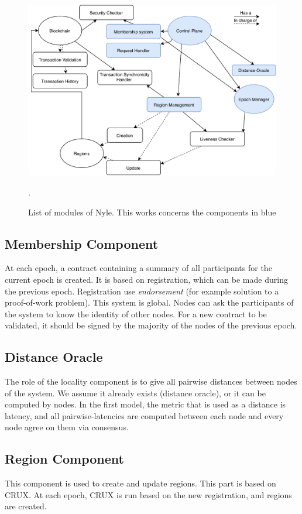 \documentclass[a4paper,11pt,oneside]{report}
\begin{document}
\begin{figure}[!h]
\centering
\includegraphics[width=400pt]{figures/Nyle_components}
\caption{List of modules of Nyle. This works concerns the components in blue}.
\label{fig:modules}
\end{figure}

\subsection{Membership Component}

At each epoch, a contract containing a summary of all participants for the
current epoch is created. It is based on registration, which can be made during
the previous epoch. Registration use \textit{endorsement} (for example solution
to a proof-of-work problem). This system is global. Nodes can ask the
participants of the system to know the identity of other nodes. For a new contract to be validated, it should be signed by the majority of the nodes of the previous
epoch.

\subsection{Distance Oracle}

The role of the locality component is to give all pairwise distances between
nodes of the system. We assume it already exists (distance oracle), or it can
be computed by nodes. In the first model, the metric that is used as a distance
is latency, and all pairwise-latencies are computed between each node and every
node agree on them via consensus. 
 
\subsection{Region Component} This component is used to create and update
regions. This part is based on CRUX. At each epoch, CRUX is run based on
the new registration, and regions are created.
 
\end{document}
